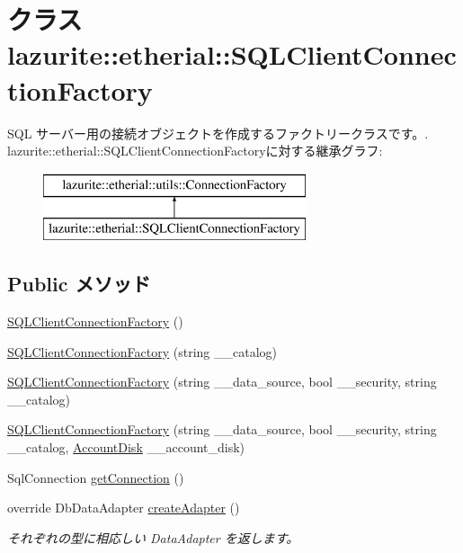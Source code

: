 \hypertarget{classlazurite_1_1etherial_1_1_s_q_l_client_connection_factory}{
\section{クラス lazurite::etherial::SQLClientConnectionFactory}
\label{classlazurite_1_1etherial_1_1_s_q_l_client_connection_factory}
}


SQL サーバー用の接続オブジェクトを作成するファクトリークラスです。.  
lazurite::etherial::SQLClientConnectionFactoryに対する継承グラフ:\begin{figure}[H]
\begin{center}
\leavevmode
\includegraphics[height=2cm]{classlazurite_1_1etherial_1_1_s_q_l_client_connection_factory}
\end{center}
\end{figure}
\subsection*{Public メソッド}
\begin{DoxyCompactItemize}
\item 
\hyperlink{classlazurite_1_1etherial_1_1_s_q_l_client_connection_factory_aad631e564e1c6efe8af47008bdf8ad25}{SQLClientConnectionFactory} ()
\item 
\hyperlink{classlazurite_1_1etherial_1_1_s_q_l_client_connection_factory_a8cd52ff389cd6e65bc27168b69e9c36b}{SQLClientConnectionFactory} (string \_\-\_\-catalog)
\item 
\hyperlink{classlazurite_1_1etherial_1_1_s_q_l_client_connection_factory_af3ae72c1c3e7901831826f827c2c1970}{SQLClientConnectionFactory} (string \_\-\_\-data\_\-source, bool \_\-\_\-security, string \_\-\_\-catalog)
\item 
\hyperlink{classlazurite_1_1etherial_1_1_s_q_l_client_connection_factory_af56744726136c9826b74bef8c8da632a}{SQLClientConnectionFactory} (string \_\-\_\-data\_\-source, bool \_\-\_\-security, string \_\-\_\-catalog, \hyperlink{classlazurite_1_1etherial_1_1utils_1_1_connection_factory_1_1_account_disk}{AccountDisk} \_\-\_\-account\_\-disk)
\item 
SqlConnection \hyperlink{classlazurite_1_1etherial_1_1_s_q_l_client_connection_factory_a1c36f41c524ba9513f12e796bc84cf48}{getConnection} ()
\item 
override DbDataAdapter \hyperlink{classlazurite_1_1etherial_1_1_s_q_l_client_connection_factory_a08a4e0e2bb826ee05ba61ddebafae227}{createAdapter} ()
\begin{DoxyCompactList}\small\item\em それぞれの型に相応しい DataAdapter を返します。 \item\end{DoxyCompactList}\end{DoxyCompactItemize}
